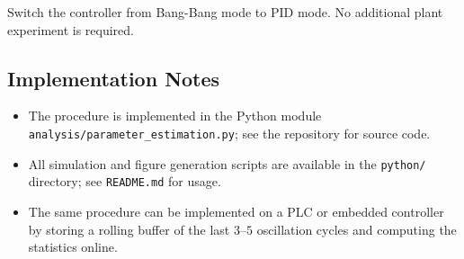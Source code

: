 Switch the controller from Bang-Bang mode to PID mode.
No additional plant experiment is required.

\subsection{Implementation Notes}
\label{sec:method:impl}

\begin{itemize}
    \item The procedure is implemented in the Python module
          \texttt{analysis/parameter\_estimation.py}; see the repository for
          source code.
    \item All simulation and figure generation scripts are available in the
          \texttt{python/} directory; see \texttt{README.md} for usage.
    \item The same procedure can be implemented on a PLC or embedded
          controller by storing a rolling buffer of the last $3\text{--}5$
          oscillation cycles and computing the statistics online.
\end{itemize}
